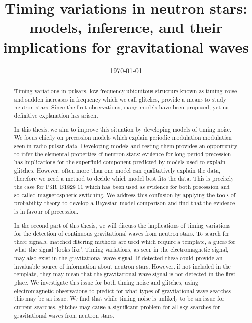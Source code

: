 \documentclass[twoside, 11pt]{thesis}
\begin{document}
\def\biblio{}

\frontmatter
\title      {Timing variations in neutron stars: models, inference, and their
             implications for gravitational waves}
\date       {\today}
\subject    {}
\keywords   {}
\maketitle

\begin{abstract}

Timing variations in pulsars, low frequency ubiquitous structure known as
timing noise and sudden increases in frequency which we call glitches, provide
a means to study neutron stars. Since the first observations, many models have
been proposed, yet no definitive explanation has arisen.

In this thesis, we aim to improve this situation by developing models of timing
noise. We focus chiefly on precession models which explain periodic modulation
modulation seen in radio pulsar data.
Developing models and testing them provides an opportunity to infer the
elemental properties of neutron stars: evidence for long period precession has
implications for the superfluid component predicted by models used to explain
glitches. However, often more than one model can
qualitatively explain the data, therefore we need a method to decide which
model best fits the data. This is precisely the case for
PSR~B1828-11 which has been used as evidence for both precession
and so-called magnetospheric switching. We address this confusion by applying the tools of
probability theory to develop a Bayesian model comparison and
find that the evidence is in favour of precession.

In the second part of this thesis, we will discuss the implications of timing
variations for the detection of continuous gravitational waves from neutron
stars. To search for these signals, matched filtering methods are used which
require a template, a guess for what the signal `looks like'. Timing
variations, as seen in the electromagnetic signal, may also exist in the
gravitational wave signal. If detected these could provide an invaluable source
of information about neutron stars. However, if not included in the template,
they may mean that the gravitational wave signal is not detected in the first
place. We investigate this issue for both timing noise and glitches, using
electromagnetic observations to predict for what types of gravitational wave
searches this may be an issue. We find that while timing noise is unlikely to
be an issue for current searches, glitches may cause a significant problem for
all-sky searches for gravitational waves from neutron stars.

\end{abstract}
\end{document}

